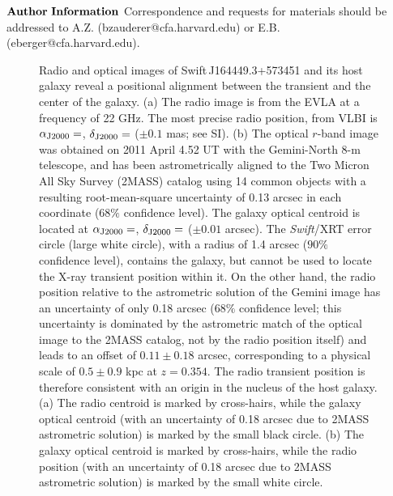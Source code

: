 \hspace{1in}

\noindent$\bf{Author~Information}$  Correspondence and requests for materials
should be addressed to A.Z. (bzauderer@cfa.harvard.edu) or
E.B. (eberger@cfa.harvard.edu).


\clearpage
\begin{figure}
\centerline{\hfill 
{}}
\caption[]{\small 
Radio and optical images of Swift\,J164449.3+573451
and its host galaxy reveal a positional alignment between the
transient and the center of the galaxy.  (a) The radio image is from
the EVLA at a frequency of 22 GHz.  The most precise radio position,
from VLBI is $\alpha_{\rm J2000}=$, $\delta_{\rm
J2000}=$ ($\pm 0.1$ mas; see SI).  (b) The
optical $r$-band image was obtained on 2011 April 4.52 UT with the
Gemini-North 8-m telescope, and has been astrometrically aligned to
the Two Micron All Sky Survey (2MASS) catalog using 14 common objects
with a resulting root-mean-square uncertainty of 0.13 arcsec in each
coordinate ($68\%$ confidence level).  The galaxy optical centroid is
located at $\alpha_{\rm J2000}=$, $\delta_{\rm
J2000}=$ ($\pm 0.01$ arcsec).  The {\it Swift}/XRT
error circle (large white circle), with a radius of 1.4 arcsec ($90\%$
confidence level), contains the galaxy, but cannot be used to locate
the X-ray transient position within it.  On the other hand, the radio
position relative to the astrometric solution of the Gemini image has
an uncertainty of only 0.18 arcsec ($68\%$ confidence level; this
uncertainty is dominated by the astrometric match of the optical image
to the 2MASS catalog, not by the radio position itself) and leads to
an offset of $0.11\pm 0.18$ arcsec, corresponding to a physical scale
of $0.5\pm 0.9$ kpc at $z=0.354$.  The radio transient position is
therefore consistent with an origin in the nucleus of the host galaxy.
(a) The radio centroid is marked by cross-hairs, while the galaxy
optical centroid (with an uncertainty of 0.18 arcsec due to 2MASS
astrometric solution) is marked by the small black circle.  (b) The
galaxy optical centroid is marked by cross-hairs, while the radio
position (with an uncertainty of 0.18 arcsec due to 2MASS astrometric
solution) is marked by the small white circle.
}
\label{fig:image} 
\end{figure}


